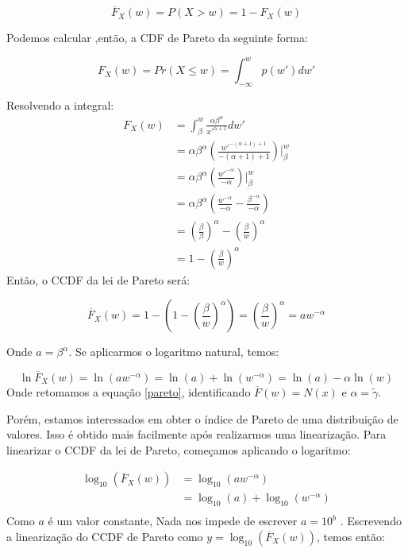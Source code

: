 $$\overline{F}_X\left(w\right)=P\left(X>w\right)=1-F_{X}\left(w\right)$$

Podemos calcular ,então, a CDF de Pareto da seguinte forma:


$$F_{X}\left(w\right)=Pr\left(X\leq w\right)=\int_{-\infty}^{w}p\left(w'\right)dw'$$

Resolvendo a integral:
\begin{equation}
    \begin{split}
        F_{X}\left(w\right)	& =\int_{\beta}^{w}\frac{\alpha\beta^{\alpha}}{x'^{\alpha+1}}dw' \\    & =\alpha\beta^{\alpha}\left(\frac{w'^{-\left(\alpha+1\right)+1}}{-\left(\alpha+1\right)+1}\right)|_{\beta}^{w}\\
    	&=\alpha\beta^{\alpha}\left(\frac{w'^{-\alpha}}{-\alpha}\right)|_{\beta}^{w}\\
    	&=\alpha\beta^{\alpha}\left(\frac{w^{-\alpha}}{-\alpha}-\frac{\beta^{-\alpha}}{-\alpha}\right)\\
    	&=\left(\frac{\beta}{\beta}\right)^{\alpha}-\left(\frac{\beta}{w}\right)^{\alpha}\\
        &=1-\left(\frac{\beta}{w}\right)^{\alpha}
    \end{split}
\end{equation}
Então, o CCDF da lei de Pareto será:

$$\overline{F}_X\left(w\right)=1-\left(1-\left(\frac{\beta}{w}\right)^{\alpha}\right)=\left(\frac{\beta}{w}\right)^{\alpha}=aw^{-\alpha}$$

Onde $a=\beta^{\alpha}$.  Se aplicarmos o logaritmo natural, temos: 

$$\ln\overline{F}_{X}\left(w\right)	=\ln\left(aw^{-\alpha}\right)=\ln\left(a\right)+\ln\left(w^{-\alpha}\right)=\ln\left(a\right)-\alpha\ln\left(w\right)$$
Onde retomamos a equação \ref{pareto}, identificando $\overline{F}(w) =N(x)$  e  $\alpha = \tilde{\gamma}$. 

Porém, estamos interessados em obter o índice de Pareto de uma distribuição de valores. Isso é obtido mais facilmente após realizarmos uma linearização. Para linearizar o CCDF da lei de Pareto, começamos aplicando o logaritmo:

\begin{equation}
    \begin{split}
         \log_{10}\left(\overline{F}_X\left(w\right)\right) & =      \log_{10}\left(aw^{-\alpha} \right)\\      
        	&=\log_{10}\left(a\right)+\log_{10}\left(w^{-\alpha}\right) \\
    \end{split}
\end{equation}
Como $a$ é um valor constante, Nada nos impede de escrever $a=10^{b}$ . Escrevendo a linearização do CCDF de Pareto como  $y=\log_{10}\left(\overline{F}_X\left(w\right)\right)$, temos então:

